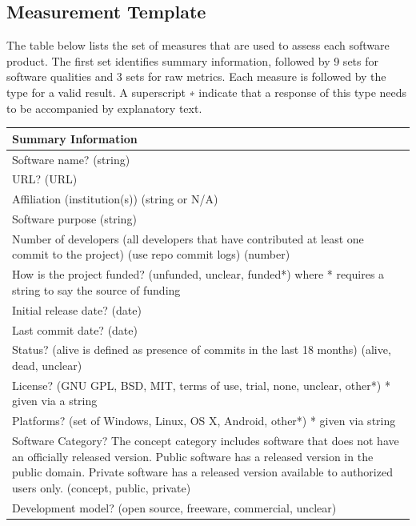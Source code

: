 \documentclass[12pt, notitlepage]{article}
\begin{document}
\newpage
\begin{appendices}

\begin{singlespace}	
	
\section{Measurement Template}\label{measurementtemplate2}
The table below lists the set of measures that are used to assess each software product. The first set identifies summary information, followed by 9 sets for software qualities and 3 sets for raw metrics. Each measure is followed by the type for a valid result. A superscript ∗ indicate that a response of this type needs to be accompanied by explanatory text.\\ 
\newpage
{}\label{measurementtemplate}
\def\arraystretch{1.22}
\begin{tabular}{p{14cm}}
	\hline
	\textbf{Summary Information}\\
	\hline
	Software name? (string)\\
	URL? (URL)\\
	Affiliation (institution(s)) (string or {N/A})\\
	Software purpose (string)\\
	Number of developers (all developers that have contributed at least one commit to the project) (use repo commit logs) (number)\\
	How is the project funded? (unfunded, unclear, funded*) where * requires a string to say the source of funding\\
	Initial release date? (date)\\
	Last commit date? (date)\\
	Status? (alive is defined as presence of commits in the last 18 months) ({alive, dead, unclear})\\
	License? ({GNU GPL, BSD, MIT, terms of use, trial, none, unclear, other*}) * given via a string \\
	Platforms? (set of {Windows, Linux, OS X, Android, other*}) * given via string\\
	Software Category? The concept category includes software that does not have an officially released version. Public software has a released version in the public domain. Private software has a released version available to authorized users only. ({concept, public, private})\\
	Development model? ({open source, freeware, commercial, unclear})\\

\end{tabular}
\end{singlespace}
\end{appendices}
\end{document}
